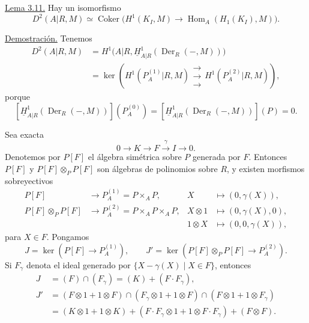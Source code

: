 \underline{Lema 3.11.} Hay un isomorfismo
\[
 D^2(A|R,M)\simeq
 \operatorname{Coker}\bigl(
 H^1(K_I,M)\longrightarrow
 \operatorname{Hom}_A(H_1(K_I),M)\bigr).
\]

\underline{Demostración.} Tenemos
\begin{align*}
D^2(A|R,M)
 &=H^1\bigl(A|R,
   \underline H^1_{A|R}(\operatorname{Der}_R(-,M))\bigr)\\
 &=\ker\left(
   H^1(P_A^{(1)}|R,M)
   \mathrel{\substack{\longrightarrow\\[-.6ex]\longrightarrow\\[-.6ex]\longrightarrow}}
   H^1(P_A^{(2)}|R,M)\right),
\end{align*}
porque
\[
 [\underline H^1_{A|R}(\operatorname{Der}_R(-,M))](P_A^{(0)})
 =[\underline H^1_{A|R}(\operatorname{Der}_R(-,M))](P)=0.
\]

Sea exacta
\[
 0\longrightarrow K\longrightarrow F\xrightarrow{\gamma}I
 \longrightarrow0.
\]
Denotemos por $P[F]$ el álgebra simétrica sobre $P$ generada por $F$.
Entonces $P[F]$ y $P[F]\otimes_PP[F]$ son álgebras de polinomios sobre
$R$, y existen morfismos sobreyectivos
\begin{align*}
P[F]&\longrightarrow P_A^{(1)}=P\times_AP,
&X&\longmapsto(0,\gamma(X)),\\
P[F]\otimes_PP[F]&\longrightarrow
P_A^{(2)}=P\times_AP\times_AP,
&X\otimes1&\longmapsto(0,\gamma(X),0),\\[-.3ex]
&&1\otimes X&\longmapsto(0,0,\gamma(X)),
\end{align*}
para $X\in F$. Pongamos
\[
 J=\ker(P[F]\longrightarrow P_A^{(1)}),
 \qquad
 J'=\ker(P[F]\otimes_PP[F]\longrightarrow P_A^{(2)}).
\]
Si $F_\gamma$ denota el ideal generado por
$\{X-\gamma(X)\mid X\in F\}$, entonces
\begin{align*}
J&=(F)\cap(F_\gamma)=(K)+(F\cdot F_\gamma),\\
J'&=(F\otimes1+1\otimes F)
 \cap(F_\gamma\otimes1+1\otimes F)
 \cap(F\otimes1+1\otimes F_\gamma)\\
&=(K\otimes1+1\otimes K)
 +(F\cdot F_\gamma\otimes1+1\otimes F\cdot F_\gamma)
 +(F\otimes F).
\end{align*}


